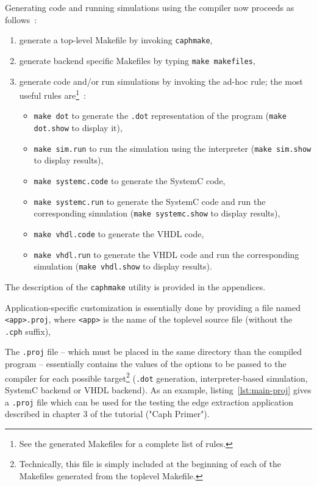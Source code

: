 Generating code and running simulations using the \caph compiler now proceeds as follows~:
\begin{enumerate}
\item generate a top-level Makefile by invoking \verb|caphmake|,
\item generate backend specific Makefiles by typing \verb|make makefiles|,
\item generate code and/or run simulations by invoking the ad-hoc rule; the most useful rules
  are\footnote{See the generated Makefiles for a complete list of rules.}~:
  \begin{itemize}
  \item \verb|make dot| to generate the \verb|.dot| representation of the program (\verb|make dot.show| to display it),
  \item \verb|make sim.run| to run the simulation using the interpreter (\verb|make sim.show| to display results),
  \item \verb|make systemc.code| to generate the SystemC code,
  \item \verb|make systemc.run| to generate the SystemC code and run the corresponding simulation (\verb|make systemc.show| to display results),
  \item \verb|make vhdl.code| to generate the VHDL code,
  \item \verb|make vhdl.run| to generate the VHDL code and run the corresponding simulation
    (\verb|make vhdl.show| to display results).
  \end{itemize}
\end{enumerate}

\medskip
The description of the \verb|caphmake| utility is provided in the appendices.

\medskip
Application-specific customization is essentially done by providing a file named
\verb|<app>.proj|, where \verb|<app>| is the name of the toplevel \caph source file
  (without the \verb|.cph| suffix),

  The \verb|.proj| file -- which must be placed in the same directory than the compiled program --
  essentially contains the values of the options to be passed to the compiler for each possible
  target\footnote{Technically, this file is simply included at the beginning of each of the
    Makefiles generated from the toplevel Makefile.} (\verb|.dot| generation, interpreter-based
  simulation, SystemC backend or VHDL backend). As an example, listing~\ref{lst:main-proj} gives a
  \verb|.proj| file which can be used for the testing the edge extraction application described in
  chapter 3 of the \caph tutorial ("Caph Primer").

